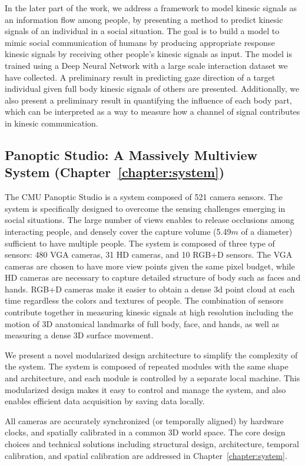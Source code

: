 In the later part of the work, we address a framework to model kinesic signals as an information flow among people, by presenting a method to predict kinesic signals of an individual in a social situation. The goal is to build a model to mimic social communication of humans by producing appropriate response kinesic signals by receiving other people's kinesic signals as input. The model is trained using a Deep Neural Network with a large scale interaction dataset we have collected. A preliminary result in predicting gaze direction of a target individual given full body kinesic signals of others are presented. Additionally, we also present a preliminary result in quantifying the influence of each body part, which can be interpreted as a way to measure how a channel of signal contributes in kinesic communication. 

\subsection{Panoptic Studio: A Massively Multiview System (Chapter~\ref{chapter:system})}
The CMU Panoptic Studio is a system composed of 521 camera sensors. The system is specifically designed to overcome the sensing challenges emerging in social situations. The large number of views enables to release occlusions among interacting people, and densely cover the capture volume (5.49$m$ of a diameter) sufficient to have multiple people. The system is composed of three type of sensors: 480 VGA cameras, 31 HD cameras, and 10 RGB+D sensors. The VGA cameras are chosen to have more view points given the same pixel budget, while HD cameras are necessary to capture detailed structure of body such as faces and hands. RGB+D cameras make it easier to obtain a dense 3d point cloud at each time regardless the colors and textures of people. The combination of sensors contribute together in measuring kinesic signals at high resolution including the motion of 3D anatomical landmarks of full body, face, and hands, as well as measuring a dense 3D surface movement. 

We present a novel modularized design architecture to simplify the complexity of the system. The system is composed of repeated modules with the same shape and architecture, and each module is controlled by a separate local machine. This modularized design makes it easy to control and manage the system, and also enables efficient data acquisition by saving data locally. 

All cameras are accurately synchronized (or temporally aligned) by hardware clocks, and spatially calibrated in a common 3D world space. The core design choices and technical solutions including structural design, architecture, temporal calibration, and spatial calibration are addressed in Chapter~\ref{chapter:system}.

